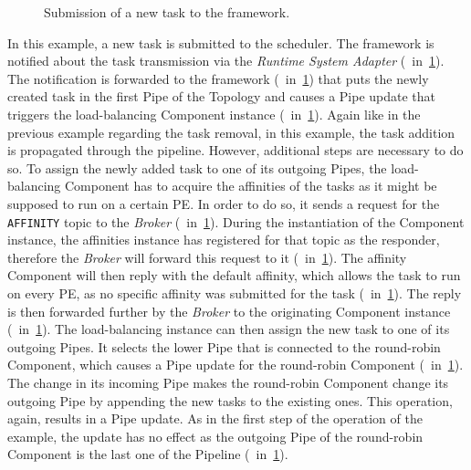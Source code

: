 \begin{figure}[b!] \centering
	\caption[Submission of a new task to the CoBaS framework.]{Submission of a new task to the \cobas{} framework.}%
	\label{fig:arch:example:step2}
\end{figure}

In this example, a new task is submitted to the scheduler. The framework is notified about the task transmission via the \emph{Runtime System Adapter} (~in~\cref{fig:arch:example:step2}). The notification is forwarded to the framework (~in~\cref{fig:arch:example:step2}) that puts the newly created  task in the first Pipe of the Topology and causes a Pipe update that triggers the load-balancing Component instance (~in~\cref{fig:arch:example:step2}). Again like in the previous example regarding the task removal, in this example, the task addition is propagated through the pipeline. However, additional steps are necessary to do so. To assign the newly added task to one of its outgoing Pipes, the load-balancing Component has to acquire the affinities of the tasks as it might be supposed to run on a certain \ac{PE}. In order to do so, it sends a request for the \texttt{AFFINITY} topic to the \emph{Broker} (~in~\cref{fig:arch:example:step2}). During the instantiation of the Component instance, the affinities instance has registered for that topic as the responder, therefore the \emph{Broker} will forward this request to it (~in~\cref{fig:arch:example:step2}). The affinity Component will then reply with the default affinity, which allows the task to run on every \ac{PE}, as no specific affinity was submitted for the  task (~in~\cref{fig:arch:example:step2}). The reply is then forwarded further by the \emph{Broker} to the originating Component instance (~in~\cref{fig:arch:example:step2}). The load-balancing instance can then assign the new task to one of its outgoing Pipes. It selects the lower Pipe that is connected to the round-robin Component, which causes a Pipe update for the round-robin Component (~in~\cref{fig:arch:example:step2}). The change in its incoming Pipe makes the round-robin Component change its outgoing Pipe by appending the new tasks to the existing ones. This operation, again, results in a Pipe update. As in the first step of the operation of the example, the update has no effect as the outgoing Pipe of the round-robin Component is the last one of the Pipeline (~in~\cref{fig:arch:example:step2}).

